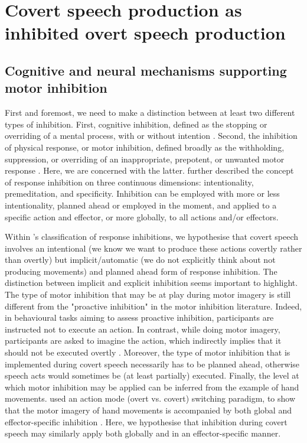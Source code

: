 \documentclass[utf8]{template/frontiersSCNS} %
\begin{document}
\section{Covert speech production as inhibited overt speech production}

\subsection{Cognitive and neural mechanisms supporting motor inhibition}

First and foremost, we need to make a distinction between at least two different types of inhibition. First, cognitive inhibition, defined as the stopping or overriding of a mental process, with or without intention \citep{gorfein_concept_2007}. Second, the inhibition of physical response, or motor inhibition, defined broadly as the withholding, suppression, or overriding of an inappropriate, prepotent, or unwanted motor response \citep{aron_neural_2007, oshea_go_2018}. Here, we are concerned with the latter. \cite{ridderinkhof_dont_2014} further described the concept of response inhibition on three continuous dimensions: intentionality, premeditation, and specificity. Inhibition can be employed with more or less intentionality, planned ahead or employed in the moment, and applied to a specific action and effector, or more globally, to all actions and/or effectors.

Within \citeauthor{ridderinkhof_dont_2014}'s classification of response inhibitions, we hypothesise that covert speech involves an intentional (we know we want to produce these actions covertly rather than overtly) but implicit/automatic (we do not explicitly think about not producing movements) and planned ahead form of response inhibition. The distinction between implicit and explicit inhibition seems important to highlight. The type of motor inhibition that may be at play during motor imagery is still different from the "proactive inhibition" in the motor inhibition literature. Indeed, in behavioural tasks aiming to assess proactive inhibition, participants are instructed not to execute an action. In contrast, while doing motor imagery, participants are asked to imagine the action, which indirectly implies that it should not be executed overtly \citep{guillot_imagining_2012}. Moreover, the type of motor inhibition that is implemented during covert speech necessarily has to be planned ahead, otherwise speech acts would sometimes be (at least partially) executed. Finally, the level at which motor inhibition may be applied can be inferred from the example of hand movements. \cite{rieger_inhibition_2017} used an action mode (overt vs. covert) switching paradigm, to show that the motor imagery of hand movements is accompanied by both global and effector-specific inhibition \citep[these results were also replicated in][]{bart_decay_2021, bart_expectations_2021, bart_inhibitory_2021, scheil_motor_2018}. Here, we hypothesise that inhibition during covert speech may similarly apply both globally and in an effector-specific manner.
\end{document}
